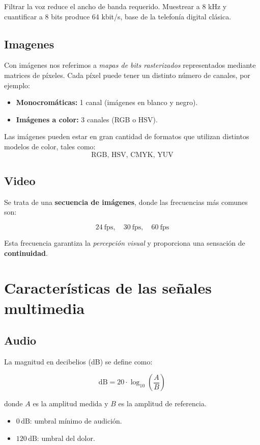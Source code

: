 \documentclass[11pt,a4paper]{article}
\begin{document}
\begin{ResumenBox}
Filtrar la voz reduce el ancho de banda requerido. Muestrear a 8 kHz y cuantificar a 8 bits produce 64 kbit/s, base de la telefonía digital clásica.
\end{ResumenBox}

\subsection{Imagenes}

Con imágenes nos referimos a \textit{mapas de bits rasterizados} representados mediante matrices de píxeles.
Cada píxel puede tener un distinto número de canales, por ejemplo:
\begin{itemize}
    \item \textbf{Monocromáticas:} 1 canal (imágenes en blanco y negro).
    \item \textbf{Imágenes a color:} 3 canales (RGB o HSV).
\end{itemize}

Las imágenes pueden estar en gran cantidad de formatos que utilizan distintos modelos de color, tales como:
\[
\text{RGB, HSV, CMYK, YUV}
\]

\subsection{Video}

Se trata de una \textbf{secuencia de imágenes}, donde las frecuencias más comunes son:

\[
24 \ \text{fps}, \quad 30 \ \text{fps}, \quad 60 \ \text{fps}
\]

Esta frecuencia garantiza la \textit{percepción visual} y proporciona una sensación de \textbf{continuidad}.

\section{Características de las señales multimedia}
\subsection{Audio}
La magnitud en decibelios (dB) se define como:

\[
\text{dB} = 20 \cdot \log_{10}\!\left(\frac{A}{B}\right)
\]

donde $A$ es la amplitud medida y $B$ es la amplitud de referencia.

\begin{itemize}
    \item $0 \,\text{dB}$: umbral mínimo de audición.
    \item $120 \,\text{dB}$: umbral del dolor.
\end{itemize}
\end{document}
